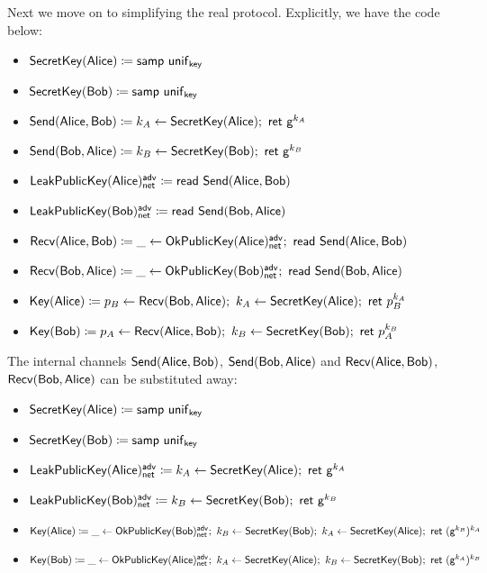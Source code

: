 \noindent Next we move on to simplifying the real protocol.  Explicitly, we have the code below:

\begin{itemize}
\item $\mathsf{SecretKey}(\mathsf{Alice}) \coloneqq \mathsf{samp} \ \mathsf{unif}_{\mathsf{key}}$
\item $\mathsf{SecretKey}(\mathsf{Bob}) \coloneqq \mathsf{samp} \ \mathsf{unif}_{\mathsf{key}}$
\item $\mathsf{Send}(\mathsf{Alice},\mathsf{Bob}) \coloneqq k_A \leftarrow \mathsf{SecretKey}(\mathsf{Alice}); \ \mathsf{ret} \ \mathsf{g}^{k_A}$
\item $\mathsf{Send}(\mathsf{Bob},\mathsf{Alice}) \coloneqq k_B \leftarrow \mathsf{SecretKey}(\mathsf{Bob}); \ \mathsf{ret} \ \mathsf{g}^{k_B}$
\item $\mathsf{LeakPublicKey}(\mathsf{Alice})^{\mathsf{adv}}_{\mathsf{net}} \coloneqq \mathsf{read} \ \mathsf{Send}(\mathsf{Alice},\mathsf{Bob})$
\item $\mathsf{LeakPublicKey}(\mathsf{Bob})^{\mathsf{adv}}_{\mathsf{net}} \coloneqq \mathsf{read} \ \mathsf{Send}(\mathsf{Bob},\mathsf{Alice})$
\item $\Recv(\Alice,\Bob) \coloneqq \_ \leftarrow \OkPublicKey(\Alice)^\adv_\net; \ \read{\Send(\Alice,\Bob)}$
\item $\Recv(\Bob,\Alice) \coloneqq \_ \leftarrow \OkPublicKey(\Bob)^\adv_\net; \ \read{\Send(\Bob,\Alice)}$
\item $\Key(\Alice) \coloneqq p_B \leftarrow \Recv(\Bob,\Alice); \ k_A \leftarrow \SecretKey(\Alice); \ \ret{p_B^{k_A}}$
\item $\Key(\Bob) \coloneqq p_A \leftarrow \Recv(\Alice,\Bob); \ k_B \leftarrow \SecretKey(\Bob); \ \ret{p_A^{k_B}}$
\end{itemize}

\noindent The internal channels $\mathsf{Send}(\mathsf{Alice},\mathsf{Bob})$, $\mathsf{Send}(\mathsf{Bob},\mathsf{Alice})$ and $\mathsf{Recv}(\mathsf{Alice},\mathsf{Bob})$, $\mathsf{Recv}(\mathsf{Bob},\mathsf{Alice})$ can be substituted away:

\begin{itemize}
\item $\mathsf{SecretKey}(\mathsf{Alice}) \coloneqq \mathsf{samp} \ \mathsf{unif}_{\mathsf{key}}$
\item $\mathsf{SecretKey}(\mathsf{Bob}) \coloneqq \mathsf{samp} \ \mathsf{unif}_{\mathsf{key}}$
\item {\color{red} $\LeakPublicKey(\Alice)^\adv_\net \coloneqq k_A \leftarrow \SecretKey(\Alice); \ \ret{\gen^{k_A}}$}
\item {\color{red} $\LeakPublicKey(\Bob)^\adv_\net \coloneqq k_B \leftarrow \SecretKey(\Bob); \ \ret{\gen^{k_B}}$}
\item {\color{red} $\Key(\Alice) \coloneqq \_ \leftarrow \OkPublicKey(\Bob)^\adv_\net; \ k_B \leftarrow \SecretKey(\Bob); \ k_A \leftarrow \SecretKey(\Alice); \ \ret{(\gen^{k_B})}^{k_A}$}
\item {\color{red} $\Key(\Bob) \coloneqq \_ \leftarrow \OkPublicKey(\Alice)^\adv_\net; \ k_A \leftarrow \SecretKey(\Alice); \ k_B \leftarrow \SecretKey(\Bob); \ \ret{(\gen^{k_A})}^{k_B}$}
\end{itemize}

